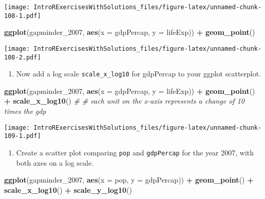 \documentclass[]{article}
\newenvironment{Shaded}{\begin{snugshade}}{\end{snugshade}}
\newcommand{\KeywordTok}[1]{\textcolor[rgb]{0.13,0.29,0.53}{\textbf{#1}}}
\newcommand{\DataTypeTok}[1]{\textcolor[rgb]{0.13,0.29,0.53}{#1}}
\newcommand{\DecValTok}[1]{\textcolor[rgb]{0.00,0.00,0.81}{#1}}
\newcommand{\StringTok}[1]{\textcolor[rgb]{0.31,0.60,0.02}{#1}}
\newcommand{\CommentTok}[1]{\textcolor[rgb]{0.56,0.35,0.01}{\textit{#1}}}
\newcommand{\OperatorTok}[1]{\textcolor[rgb]{0.81,0.36,0.00}{\textbf{#1}}}
\newcommand{\NormalTok}[1]{#1}
\providecommand{\tightlist}{%
  \setlength{\itemsep}{0pt}\setlength{\parskip}{0pt}}
\begin{document}
\texttt{[image: IntroRExercisesWithSolutions\_files/figure-latex/unnamed-chunk-108-1.pdf]}

\begin{Shaded}
\begin{Highlighting}[]
\KeywordTok{ggplot}\NormalTok{(gapminder_}\DecValTok{2007}\NormalTok{, }\KeywordTok{aes}\NormalTok{(}\DataTypeTok{x =}\NormalTok{ gdpPercap, }\DataTypeTok{y =}\NormalTok{ lifeExp)) }\OperatorTok{+}
\StringTok{  }\KeywordTok{geom_point}\NormalTok{()}
\end{Highlighting}
\end{Shaded}

\texttt{[image: IntroRExercisesWithSolutions\_files/figure-latex/unnamed-chunk-108-2.pdf]}

\begin{enumerate}
\def\labelenumi{\arabic{enumi}.}
\setcounter{enumi}{3}
\tightlist
\item
  Now add a log scale \texttt{scale\_x\_log10} for gdpPercap to your
  ggplot scatterplot.
\end{enumerate}

\begin{Shaded}
\begin{Highlighting}[]
\KeywordTok{ggplot}\NormalTok{(gapminder_}\DecValTok{2007}\NormalTok{, }\KeywordTok{aes}\NormalTok{(}\DataTypeTok{x =}\NormalTok{ gdpPercap, }\DataTypeTok{y =}\NormalTok{ lifeExp)) }\OperatorTok{+}
\StringTok{  }\KeywordTok{geom_point}\NormalTok{() }\OperatorTok{+}
\StringTok{  }\KeywordTok{scale_x_log10}\NormalTok{() }\CommentTok{# # each unit on the x-axis represents a change of 10 times the gdp}
\end{Highlighting}
\end{Shaded}

\texttt{[image: IntroRExercisesWithSolutions\_files/figure-latex/unnamed-chunk-109-1.pdf]}

\begin{enumerate}
\def\labelenumi{\arabic{enumi}.}
\setcounter{enumi}{4}
\tightlist
\item
  Create a scatter plot comparing \texttt{pop} and \texttt{gdpPercap}
  for the year 2007, with both axes on a log scale.
\end{enumerate}

\begin{Shaded}
\begin{Highlighting}[]
\KeywordTok{ggplot}\NormalTok{(gapminder_}\DecValTok{2007}\NormalTok{, }\KeywordTok{aes}\NormalTok{(}\DataTypeTok{x =}\NormalTok{ pop, }\DataTypeTok{y =}\NormalTok{ gdpPercap)) }\OperatorTok{+}
\StringTok{  }\KeywordTok{geom_point}\NormalTok{() }\OperatorTok{+}
\StringTok{  }\KeywordTok{scale_x_log10}\NormalTok{() }\OperatorTok{+}
\StringTok{  }\KeywordTok{scale_y_log10}\NormalTok{()}
\end{Highlighting}
\end{Shaded}
\end{document}
